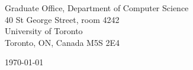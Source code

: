 \begin{minipage}{0.49\textwidth}
\begin{flushleft}
\noindent
Graduate Office, Department of Computer Science \\
40 St George Street, room 4242\\
University of Toronto \\
Toronto, ON, Canada M5S 2E4
\end{flushleft}
\end{minipage}
\begin{minipage}{0.47\textwidth}
\begin{flushright}
\today
\end{flushright}
\end{minipage} \\

\newcommand{\univ}{University of Toronto}
\newcommand{\univshort}{UT}
\newcommand{\degree}{Ph.D.}
\newcommand{\dept}{Computer Science}
